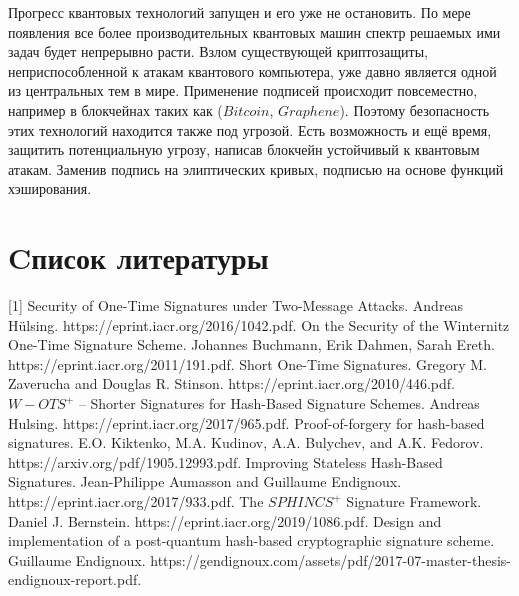 \documentclass[a4paper, 14pt]{extarticle}
\begin{document}
Прогресс квантовых технологий запущен и его уже не остановить. По мере появления все более производительных квантовых машин спектр решаемых ими задач будет непрерывно расти. Взлом существующей криптозащиты, неприспособленной к атакам квантового компьютера, уже давно является одной из центральных тем в мире. Применение подписей происходит повсеместно, например в блокчейнах таких как ($Bitcoin$, $Graphene$). Поэтому безопасность этих технологий находится также под угрозой. Есть возможность и ещё время, защитить потенциальную угрозу, написав блокчейн устойчивый к квантовым атакам. Заменив подпись на элиптических кривых, подписью на основе функций хэширования.
\newpage

\section{Cписок литературы}
[1] Security of One-Time Signatures under Two-Message Attacks. Andreas Hülsing. https://eprint.iacr.org/2016/1042.pdf.
\newline
\newline
[2] On the Security of the Winternitz One-Time Signature Scheme. Johannes Buchmann, Erik Dahmen, Sarah Ereth. https://eprint.iacr.org/2011/191.pdf.
\newline
\newline
[3] Short One-Time Signatures. Gregory M. Zaverucha and Douglas R. Stinson. https://eprint.iacr.org/2010/446.pdf.
\newline
\newline
[4] $W-OTS^{+}$ – Shorter Signatures for Hash-Based Signature Schemes. Andreas Hulsing. https://eprint.iacr.org/2017/965.pdf.
\newline
\newline
[5] Proof-of-forgery for hash-based signatures. E.O. Kiktenko, M.A. Kudinov, A.A. Bulychev, and A.K. Fedorov. https://arxiv.org/pdf/1905.12993.pdf.
\newline
\newline
[6] Improving Stateless Hash-Based Signatures. Jean-Philippe Aumasson and Guillaume Endignoux. https://eprint.iacr.org/2017/933.pdf.
\newline
\newline
[7] The $SPHINCS^{+}$ Signature Framework. Daniel J. Bernstein. https://eprint.iacr.org/2019/1086.pdf.
\newline
\newline
[8] Design and implementation of a post-quantum
hash-based cryptographic signature scheme. Guillaume Endignoux. https://gendignoux.com/assets/pdf/2017-07-master-thesis-endignoux-report.pdf.
\newpage
\end{document}
